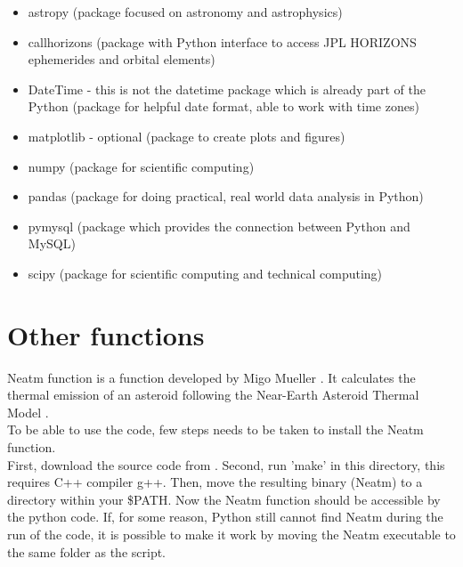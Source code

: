 \begin{itemize}
    \item astropy (package focused on astronomy and astrophysics)
    \item callhorizons (package with Python interface to access JPL HORIZONS ephemerides and orbital elements)
    \item DateTime - this is not the datetime package which is already part of the Python (package for helpful date format, able to work with time zones)
    \item matplotlib - optional (package to create plots and figures)
    \item numpy (package for scientific computing)
    \item pandas (package for doing practical, real world data analysis in Python)
    \item pymysql (package which provides the connection between Python and MySQL)
    \item scipy (package for scientific computing and technical computing)
 
\end{itemize}

\section{Other functions}
Neatm function is a function developed by Migo Mueller \cite{neatm}. It calculates the thermal emission of an asteroid following the Near-Earth Asteroid Thermal Model \cite{neatmm}.\\

To be able to use the code, few steps needs to be taken to install the Neatm function.\\
First, download the
source code from \cite{neatm}. 
Second, run 'make' in this directory, this requires C++ compiler g++. 
Then, move the resulting binary (Neatm) to a directory within your \$PATH.
Now the Neatm function should be accessible by the python code.
If, for some reason, Python still cannot find Neatm during the run of the code, it is possible to make it work by moving the Neatm executable to the same folder as the script.